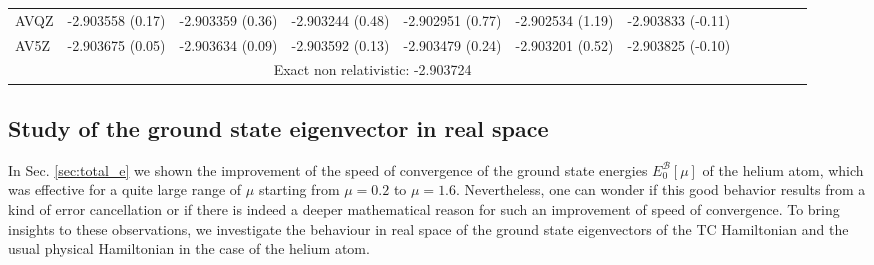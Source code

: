 \documentclass[aip,jcp,reprint,noshowkeys,superscriptaddress,twocolumn]{revtex4-1}
\newcommand{\basis}[0]{\mathcal{B}}
\begin{document}
\begin{table}
\begin{ruledtabular}
\begin{tabular}{llllllllllll}
 AVQZ        &    -2.903558 (0.17)   &    -2.903359 (0.36)   &    -2.903244 (0.48)   &    -2.902951 (0.77)  &    -2.902534 (1.19)  &    -2.903833 (-0.11)\\
 AV5Z        &    -2.903675 (0.05)   &    -2.903634 (0.09)   &    -2.903592 (0.13)   &    -2.903479 (0.24)  &    -2.903201 (0.52)  &    -2.903825 (-0.10)\\
\hline                                                                                                                                                   
\multicolumn{7}{c}{Exact non relativistic: -2.903724}   \\
\end{tabular}
\end{ruledtabular}
\label{table_conv_e_mu}
\end{table}

\subsection{Study of the ground state eigenvector in real space}
\label{sec:he_real_space}
In Sec. \ref{sec:total_e} we shown the improvement of the speed of convergence of the ground state energies $E_0^{\basis}[\mu]$ of the helium atom, which was effective for a quite large range of $\mu$ starting from $\mu=0.2$ to $\mu=1.6$. 
Nevertheless, one can wonder if this good behavior results from a kind of error cancellation or if there is indeed a deeper mathematical reason for such an improvement of speed of convergence. 
To bring insights to these observations, we investigate the behaviour in real space of the ground state eigenvectors of the TC Hamiltonian and the usual physical Hamiltonian in the case of the helium atom. 
\end{document}

